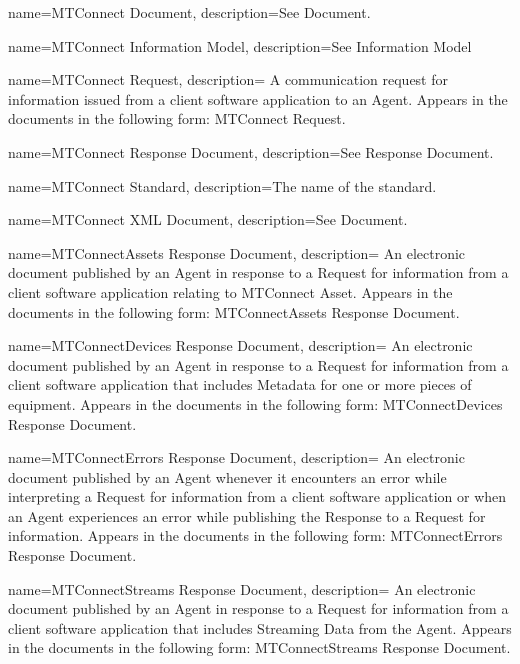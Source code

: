 {
    name={MTConnect Document},
	description={See \gls{Document}.}
}

{
    name={MTConnect Information Model},
	description={See \gls{Information Model}}
}

{
    name={MTConnect Request},
	description={
	A communication request for information issued from a client software application to an \gls{Agent}.
	Appears in the documents in the following form: \gls{MTConnect Request}.
}
}

{
    name={MTConnect Response Document},
	description={See \gls{Response Document}.}
}

{
    name={MTConnect Standard},
	description={The name of the standard.}
}

{
    name={MTConnect XML Document},
	description={See \gls{Document}.}
}

{
    name={MTConnectAssets Response Document},
	description={
	An electronic document published by an \gls{Agent} in response to a \gls{Request} for information from a client software application relating to \gls{MTConnect Asset}.
	Appears in the documents in the following form: \gls{MTConnectAssets Response Document}.
}
}

{
    name={MTConnectDevices Response Document},
	description={
	An electronic document published by an \gls{Agent} in response to a \gls{Request} for information from a client software application that includes \gls{Metadata} for one or more pieces of equipment.
	Appears in the documents in the following form: \gls{MTConnectDevices Response Document}.
}
}

{
    name={MTConnectErrors Response Document},
	description={
	An electronic document published by an \gls{Agent} whenever it encounters an error while interpreting a \gls{Request} for information from a client software application or when an \gls{Agent} experiences an error while publishing the \gls{Response} to a \gls{Request} for information.
	Appears in the documents in the following form: \gls{MTConnectErrors Response Document}.
}
}

{
    name={MTConnectStreams Response Document},
	description={
	An electronic document published by an \gls{Agent} in response to a \gls{Request} for information from a client software application that includes \gls{Streaming Data} from the \gls{Agent}.
	Appears in the documents in the following form: \gls{MTConnectStreams Response Document}.
}
}

